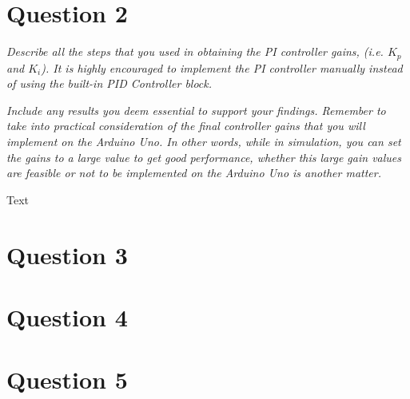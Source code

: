 \documentclass[11pt, onecolumn]{article}
\begin{document}
\section*{Question 2}
\par \textit{Describe all the steps that you used in obtaining the PI controller gains, (i.e. $K_p$ and $K_i$). It is highly encouraged to implement the PI controller manually instead of using the built-in PID Controller block.}
\par \textit{Include any results you deem essential to support your findings. Remember to take into practical consideration of the final controller gains that you will implement on the Arduino Uno. In other words, while in simulation, you can set the gains to a large value to get good performance, whether this large gain values are feasible or not to be implemented on the Arduino Uno is another matter.}
\par Text
\section*{Question 3}
\lipsum[1]
\section*{Question 4}
\lipsum[1]
\section*{Question 5}
\lipsum[1]
\end{document}
